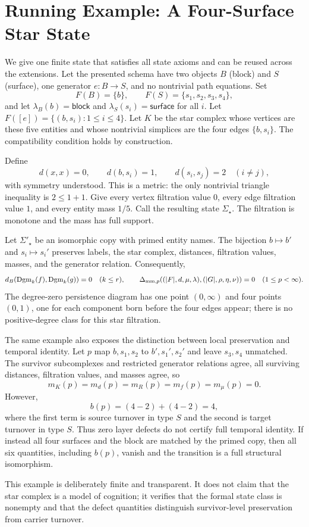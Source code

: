 \section{Running Example: A Four-Surface Star State}

We give one finite state that satisfies all state axioms and can be reused across
the extensions. Let the presented schema have two objects $B$ (block) and
$S$ (surface), one generator $e:B\to S$, and no nontrivial path equations.
Set
\[
F(B)=\{b\},\qquad F(S)=\{s_1,s_2,s_3,s_4\},
\]
and let $\lambda_B(b)=\mathsf{block}$ and $\lambda_S(s_i)=\mathsf{surface}$ for all $i$. Let $F([e])=\{(b,s_i):1\leq i\leq4\}$. Let $K$ be the star complex whose
vertices are these five entities and whose nontrivial simplices are the four
edges $\{b,s_i\}$. The compatibility condition holds by construction.

Define
\[
d(x,x)=0,\qquad d(b,s_i)=1,\qquad d(s_i,s_j)=2\quad(i\ne j),
\]
with symmetry understood. This is a metric: the only nontrivial triangle
inequality is $2\leq1+1$. Give every vertex filtration value $0$, every edge
filtration value $1$, and every entity mass $1/5$. Call the resulting state
$\Sigma_\star$. The filtration is monotone and the mass has full support.

Let $\Sigma'_\star$ be an isomorphic copy with primed entity names. The
bijection $b\mapsto b'$ and $s_i\mapsto s_i'$ preserves labels, the star
complex, distances, filtration values, masses, and the generator relation.
Consequently,
\[
d_B(\operatorname{Dgm}_k(f),\operatorname{Dgm}_k(g))=0\quad(k\leq r),\qquad
\Delta_{\mathrm{mm},p}((|F|,d,\mu,\lambda),(|G|,\rho,\eta,\nu))=0
\quad(1\leq p<\infty).
\]
The degree-zero persistence diagram has one point $(0,\infty)$ and four points $(0,1)$, one for each component born before the four edges appear; there is no
positive-degree class for this star filtration.

The same example also exposes the distinction between local preservation and
temporal identity. Let $p$ map $b,s_1,s_2$ to $b',s_1',s_2'$ and leave
$s_3,s_4$ unmatched. The survivor subcomplexes and restricted generator
relations agree, all surviving distances, filtration values, and masses agree,
so
\[
m_K(p)=m_d(p)=m_R(p)=m_f(p)=m_\mu(p)=0.
\]
However,
\[
b(p)=(4-2)+(4-2)=4,
\]
where the first term is source turnover in type $S$ and the second is target
turnover in type $S$. Thus zero layer defects do not certify full temporal
identity. If instead all four surfaces and the block are matched by the primed
copy, then all six quantities, including $b(p)$, vanish and the transition is
a full structural isomorphism.

This example is deliberately finite and transparent. It does not claim that
the star complex is a model of cognition; it verifies that the formal state
class is nonempty and that the defect quantities distinguish survivor-level
preservation from carrier turnover.